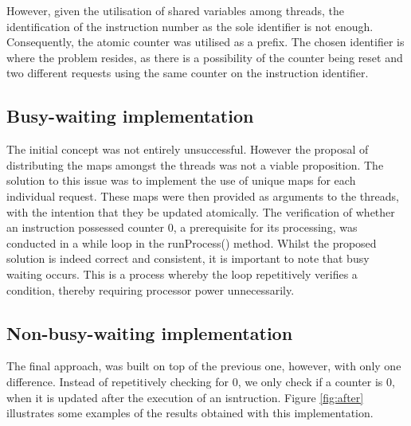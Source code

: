 \documentclass{report}
\begin{document}
However, given the utilisation of shared variables among threads, the identification of the instruction number as the sole identifier is not enough. Consequently, the atomic counter was utilised as a prefix. The chosen identifier is where the problem resides, as there is a possibility of the counter being reset and two different requests using the same counter on the instruction identifier.

\subsection*{Busy-waiting implementation}

The initial concept was not entirely unsuccessful. However the proposal of distributing the maps amongst the threads was not a viable proposition. The solution to this issue was to implement the use of unique maps for each individual request. These maps were then provided as arguments to the threads, with the intention that they be updated atomically. The verification of whether an instruction possessed counter 0, a prerequisite for its processing, was conducted in a while loop in the runProcess() method. Whilst the proposed solution is indeed correct and consistent, it is important to note that busy waiting occurs. This is a process whereby the loop repetitively verifies a condition, thereby requiring processor power unnecessarily.

\subsection*{Non-busy-waiting implementation}

The final approach, was built on top of the previous one, however, with only one difference. Instead of repetitively checking for 0, we only check if a counter is 0, when it is updated after the execution of an isntruction. 
Figure \ref{fig:after} illustrates some examples of the results obtained with this implementation.
\end{document}
